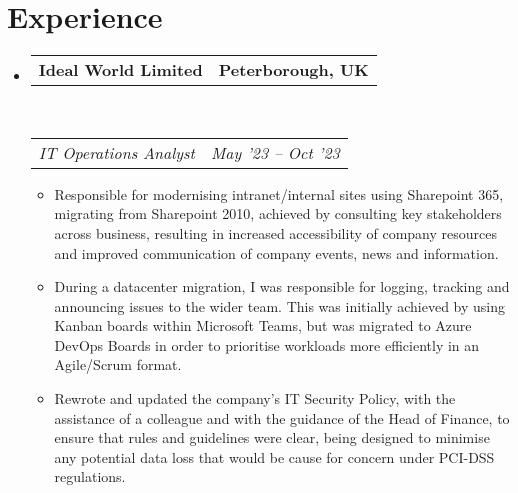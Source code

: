 \documentclass[10pt,a4paper]{article}
\makeatletter
\newcommand{\headerrow}[2]
{\begin{tabular*}{\linewidth}{l@{\extracolsep{\fill}}r}
	#1 &
	#2 \\
\end{tabular*}}
\makeatother
\begin{document}
\section{Experience}
\begin{itemize}
	\parskip=0.1em

	\item
	\headerrow
		{\textbf{Ideal World Limited}}
		{\textbf{Peterborough, UK}}
	\\
	\headerrow
		{\emph{IT Operations Analyst}}
		{\emph{May '23 -- Oct '23}}
	\begin{itemize}
		\item Responsible for modernising intranet/internal sites using Sharepoint 365, migrating from Sharepoint 2010, achieved by consulting key stakeholders across business, resulting in increased accessibility of company resources and improved communication of company events, news and information.
		\item During a datacenter migration, I was responsible for logging, tracking and announcing issues to the wider team. This was initially achieved by using Kanban boards within Microsoft Teams, but was migrated to Azure DevOps Boards in order to prioritise workloads more efficiently in an Agile/Scrum format.
		\item Rewrote and updated the company's IT Security Policy, with the assistance of a colleague and with the guidance of the Head of Finance, to ensure that rules and guidelines were clear, being designed to minimise any potential data loss that would be cause for concern under PCI-DSS regulations.
	\end{itemize}


\end{itemize}
\end{document}
